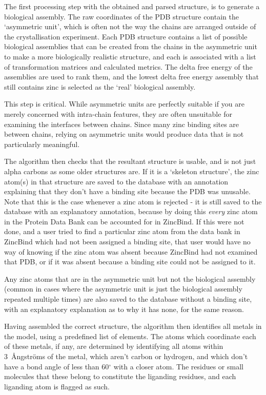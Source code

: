 The first processing step with the obtained and parsed structure, is to generate a biological assembly. The raw coordinates of the PDB structure contain the `asymmetric unit', which is often not the way the chains are arranged outside of the crystallisation experiment. Each PDB structure contains a list of possible biological assemblies that can be created from the chains in the asymmetric unit to make a more biologically realistic structure, and each is associated with a list of transformation matrices and calculated metrics. The delta free energy of the assemblies are used to rank them, and the lowest delta free energy assembly that still contains zinc is selected as the `real' biological assembly.

This step is critical. While asymmetric units are perfectly suitable if you are merely concerned with intra-chain features, they are often unsuitable for examining the interfaces between chains. Since many zinc binding sites are between chains, relying on asymmetric units would produce data that is not particularly meaningful.

The algorithm then checks that the resultant structure is usable, and is not just alpha carbons as some older structures are. If it is a `skeleton structure', the zinc atom(s) in that structure are saved to the database with an annotation explaining that they don't have a binding site because the PDB was unusable. Note that this is the case whenever a zinc atom is rejected - it is still saved to the database with an explanatory annotation, because by doing this \emph{every} zinc atom in the Protein Data Bank can be accounted for in ZincBind. If this were not done, and a user tried to find a particular zinc atom from the data bank in ZincBind which had not been assigned a binding site, that user would have no way of knowing if the zinc atom was absent because ZincBind had not examined that PDB, or if it was absent because a binding site could not be assigned to it.

Any zinc atoms that are in the asymmetric unit but not the biological assembly (common in cases where the asymmetric unit is just the biological assembly repeated multiple times) are also saved to the database without a binding site, with an explanatory explanation as to why it has none, for the same reason.

Having assembled the correct structure, the algorithm then identifies all metals in the model, using a predefined list of elements. The atoms which coordinate each of these metals, if any, are determined by identifying all atoms within 3~{\AA}ngstr\"{o}ms of the metal, which aren't carbon or hydrogen, and which don't have a bond angle of less than 60$^\circ$ with a closer atom. The residues or small molecules that these belong to constitute the liganding residues, and each liganding atom is flagged as such.

